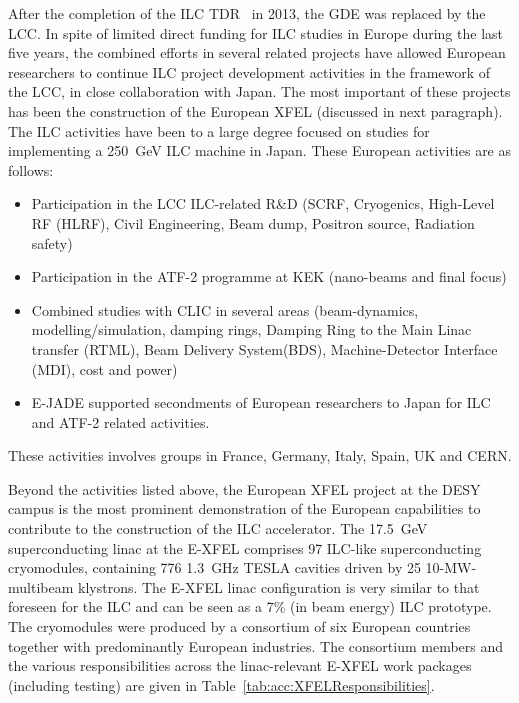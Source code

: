\documentclass[%
 reprint,
 floatfix,
 amsmath,amssymb,
 aps,
]{revtex4-1}
\begin{document}

After the completion of the ILC TDR~\cite{Adolphsen:2013kya} in 2013, the GDE was replaced by the LCC. In spite of limited direct funding for ILC studies in Europe during the last five years, the combined efforts in several related projects have allowed European researchers to continue ILC project development activities in the framework of the LCC, in close collaboration with Japan. The most important of these projects has been the construction of the European XFEL (discussed in next paragraph). The ILC activities have been to a large degree focused on studies for implementing a 250~GeV ILC machine in Japan. These European activities are as follows:

\begin{itemize}
\item Participation in the LCC ILC-related R\&D (SCRF, Cryogenics, High-Level RF (HLRF), Civil Engineering, Beam dump, Positron source, Radiation safety)
\item Participation in the ATF-2 programme at KEK (nano-beams and final focus)
\item Combined studies with CLIC in several areas (beam-dynamics, modelling/simulation, damping rings, Damping Ring to the Main Linac transfer (RTML), Beam Delivery System(BDS), Machine-Detector Interface (MDI), cost and power)
\item E-JADE supported secondments of European researchers to Japan for ILC and ATF-2 related activities.
\end{itemize}
These activities involves groups in  France, Germany, Italy, Spain, UK and CERN. 



Beyond the activities listed above, the European XFEL project at the DESY campus is the most prominent demonstration of the European capabilities
to contribute to the construction of the ILC accelerator.
The 17.5~GeV superconducting linac at the E-XFEL comprises 97 ILC-like superconducting cryomodules, containing 776 1.3~GHz TESLA cavities
driven by 25 10-MW-multibeam klystrons. The E-XFEL linac configuration is very similar to that foreseen for the ILC and can be seen as a 7\% (in beam energy) ILC prototype. The cryomodules were produced by a consortium of six European countries together with predominantly European industries. 
 The consortium members and the various responsibilities across the linac-relevant E-XFEL work packages (including testing) are given in Table~\ref{tab:acc:XFELResponsibilities}.
\end{document}
